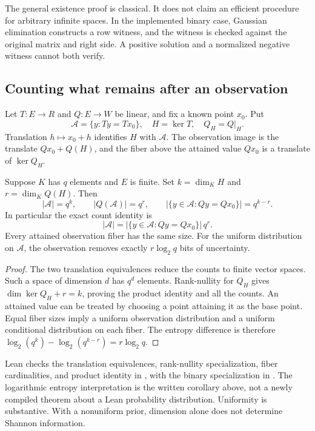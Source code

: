 The general existence proof is classical. It does not claim an efficient procedure for arbitrary infinite spaces. In the implemented binary case, Gaussian elimination constructs a row witness, and the witness is checked against the original matrix and right side. A positive solution and a normalized negative witness cannot both verify.

\subsection{Counting what remains after an observation}

Let $T:E\to R$ and $Q:E\to W$ be linear, and fix a known point $x_0$. Put
\[
\mathcal A=\{y:Ty=Tx_0\},\quad H=\ker T,\quad
Q_H=Q|_H.
\]
Translation $h\mapsto x_0+h$ identifies $H$ with $\mathcal A$. The observation image is the translate $Qx_0+Q(H)$, and the fiber above the attained value $Qx_0$ is a translate of $\ker Q_H$.

\begin{theorem}
\label{thm:checked-counts}
Suppose $K$ has $q$ elements and $E$ is finite. Set
$k=\dim_K H$ and $r=\dim_K Q(H)$. Then
\[
|\mathcal A|=q^k,\qquad
|Q(\mathcal A)|=q^r,\qquad
|\{y\in\mathcal A:Qy=Qx_0\}|=q^{k-r}.
\]
In particular the exact count identity is
\[
|\mathcal A|=
|\{y\in\mathcal A:Qy=Qx_0\}|\,q^r.
\]
Every attained observation fiber has the same size. For the uniform distribution on $\mathcal A$, the observation removes exactly $r\log_2q$ bits of uncertainty.
\end{theorem}
\begin{proof}
The two translation equivalences reduce the counts to finite vector spaces. Such a space of dimension $d$ has $q^d$ elements. Rank-nullity for $Q_H$ gives $\dim\ker Q_H+r=k$, proving the product identity and all the counts. An attained value can be treated by choosing a point attaining it as the base point. Equal fiber sizes imply a uniform observation distribution and a uniform conditional distribution on each fiber. The entropy difference is therefore $\log_2(q^k)-\log_2(q^{k-r})=r\log_2q$.
\end{proof}

Lean checks the translation equivalences, rank-nullity specialization, fiber cardinalities, and product identity in , with the binary specialization in . The logarithmic entropy interpretation is the written corollary above, not a newly compiled theorem about a Lean probability distribution. Uniformity is substantive. With a nonuniform prior, dimension alone does not determine Shannon information.


